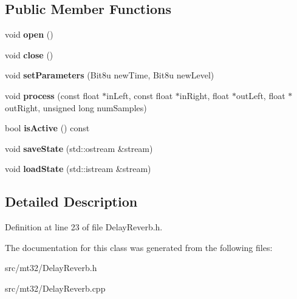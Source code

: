 \subsection*{Public Member Functions}
\begin{DoxyCompactItemize}
\item 
\hypertarget{classMT32Emu_1_1DelayReverb_a92875ff0c0c80cf353fa6888528f4a24}{void {\bfseries open} ()}\label{classMT32Emu_1_1DelayReverb_a92875ff0c0c80cf353fa6888528f4a24}

\item 
\hypertarget{classMT32Emu_1_1DelayReverb_adafac25a05283bc227684b2ed14c21ff}{void {\bfseries close} ()}\label{classMT32Emu_1_1DelayReverb_adafac25a05283bc227684b2ed14c21ff}

\item 
\hypertarget{classMT32Emu_1_1DelayReverb_a6824c39a8874e1560ba6c50c6cd94a04}{void {\bfseries set\-Parameters} (Bit8u new\-Time, Bit8u new\-Level)}\label{classMT32Emu_1_1DelayReverb_a6824c39a8874e1560ba6c50c6cd94a04}

\item 
\hypertarget{classMT32Emu_1_1DelayReverb_ad5e1c9b99b54bcfc4d5d3b120ba9c4b2}{void {\bfseries process} (const float $\ast$in\-Left, const float $\ast$in\-Right, float $\ast$out\-Left, float $\ast$out\-Right, unsigned long num\-Samples)}\label{classMT32Emu_1_1DelayReverb_ad5e1c9b99b54bcfc4d5d3b120ba9c4b2}

\item 
\hypertarget{classMT32Emu_1_1DelayReverb_a16f54dfe045c7f14bd25b0ea5d83f318}{bool {\bfseries is\-Active} () const }\label{classMT32Emu_1_1DelayReverb_a16f54dfe045c7f14bd25b0ea5d83f318}

\item 
\hypertarget{classMT32Emu_1_1DelayReverb_a15744156c4731b89fea76c64f40e5e47}{void {\bfseries save\-State} (std\-::ostream \&stream)}\label{classMT32Emu_1_1DelayReverb_a15744156c4731b89fea76c64f40e5e47}

\item 
\hypertarget{classMT32Emu_1_1DelayReverb_a5dae7f886269ad072d570c0db204e2b0}{void {\bfseries load\-State} (std\-::istream \&stream)}\label{classMT32Emu_1_1DelayReverb_a5dae7f886269ad072d570c0db204e2b0}

\end{DoxyCompactItemize}


\subsection{Detailed Description}


Definition at line 23 of file Delay\-Reverb.\-h.



The documentation for this class was generated from the following files\-:\begin{DoxyCompactItemize}
\item 
src/mt32/Delay\-Reverb.\-h\item 
src/mt32/Delay\-Reverb.\-cpp\end{DoxyCompactItemize}
